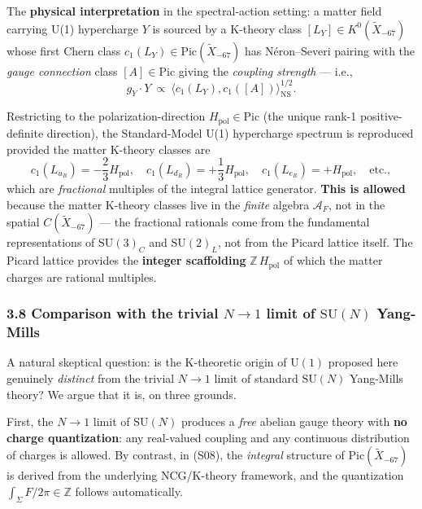 \documentclass[
  11pt,
  a4paper,
]{article}
\begin{document}
The \textbf{physical interpretation} in the spectral-action setting: a matter field carrying U(1) hypercharge \(Y\) is sourced by a K-theory class \([L_Y] \in K^0(\tilde X_{-67})\) whose first Chern class \(c_1(L_Y) \in \mathrm{Pic}(\tilde X_{-67})\) has Néron--Severi pairing with the \emph{gauge connection} class \([A] \in \mathrm{Pic}\) giving the \emph{coupling strength} --- i.e.,
\[
g_Y \cdot Y\ \propto\ \langle c_1(L_Y), c_1([A])\rangle_{\mathrm{NS}}^{1/2}.
\]

Restricting to the polarization-direction \(H_{\mathrm{pol}} \in \mathrm{Pic}\) (the unique rank-1 positive-definite direction), the Standard-Model U(1) hypercharge spectrum is reproduced provided the matter K-theory classes are
\[
c_1(L_{u_R}) = -\frac{2}{3} H_{\mathrm{pol}},\quad
c_1(L_{d_R}) = +\frac{1}{3} H_{\mathrm{pol}},\quad
c_1(L_{e_R}) = +H_{\mathrm{pol}},\quad
\text{etc.},
\]
which are \emph{fractional} multiples of the integral lattice generator. \textbf{This is allowed} because the matter K-theory classes live in the \emph{finite} algebra \(\mathcal A_F\), not in the spatial \(C(\tilde X_{-67})\) --- the fractional rationals come from the fundamental representations of \(\mathrm{SU}(3)_C\) and \(\mathrm{SU}(2)_L\), not from the Picard lattice itself. The Picard lattice provides the \textbf{integer scaffolding} \(\mathbb Z\,H_{\mathrm{pol}}\) of which the matter charges are rational multiples.

\hypertarget{comparison-with-the-trivial-n-to-1-limit-of-mathrmsun-yang-mills}{%
\subsubsection{\texorpdfstring{3.8 Comparison with the trivial \(N \to 1\) limit of \(\mathrm{SU}(N)\) Yang-Mills}{3.8 Comparison with the trivial N \textbackslash to 1 limit of \textbackslash mathrm\{SU\}(N) Yang-Mills}}\label{comparison-with-the-trivial-n-to-1-limit-of-mathrmsun-yang-mills}}

A natural skeptical question: is the K-theoretic origin of \(\mathrm{U}(1)\) proposed here genuinely \emph{distinct} from the trivial \(N \to 1\) limit of standard \(\mathrm{SU}(N)\) Yang-Mills theory? We argue that it is, on three grounds.

First, the \(N \to 1\) limit of \(\mathrm{SU}(N)\) produces a \emph{free} abelian gauge theory with \textbf{no charge quantization}: any real-valued coupling and any continuous distribution of charges is allowed. By contrast, in (S08), the \emph{integral} structure of \(\mathrm{Pic}(\tilde X_{-67})\) is derived from the underlying NCG/K-theory framework, and the quantization \(\int_\Sigma F/2\pi \in \mathbb Z\) follows automatically.
\end{document}
